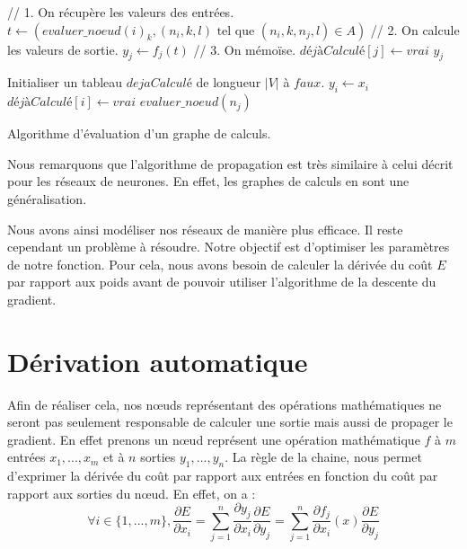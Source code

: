 \begin{algorithm} 
\begin{algorithmic}
		\State // 1. On récupère les valeurs des entrées.
		\State $t \leftarrow (evaluer\_noeud(i)_k, (n_i, k, l)\text{ tel que }(n_i, k, n_j, l) \in A)$
		\State // 2. On calcule les valeurs de sortie.
		\State $y_j \leftarrow f_j(t)$
		\State // 3. On mémoïse.
		\State $déjàCalculé[j] \leftarrow vrai$
	\EndIf
	\State \Return $y_j$
\EndFunction

\State Initialiser un tableau $dejaCalculé$ de longueur $|V|$ à $faux$.
	\State $y_i \leftarrow x_i$
	\State $déjàCalculé[i] \leftarrow vrai$ 
\EndFor
{}
	\State $evaluer\_noeud(n_j)$ 
\EndFor
\EndProcedure
\end{algorithmic}
\caption{Algorithme d'évaluation d'un graphe de calculs.}
\label{propagation_memoisation1}
\end{algorithm}

Nous remarquons que l'algorithme de propagation est très similaire à celui décrit pour les réseaux de neurones. En effet, les graphes de calculs en sont une généralisation.

Nous avons ainsi modéliser nos réseaux de manière plus efficace. Il reste cependant un problème à résoudre. Notre objectif est d'optimiser les paramètres de notre fonction. Pour cela, nous avons besoin de calculer la dérivée du coût $E$ par rapport aux poids avant de pouvoir utiliser l'algorithme de la descente du gradient.

\section{Dérivation automatique}

Afin de réaliser cela, nos n\oe{}uds représentant des opérations mathématiques ne seront pas seulement responsable de calculer une sortie mais aussi de propager le gradient. En effet prenons un n\oe{}ud représent une opération mathématique $f$ à $m$ entrées $x_1, ..., x_m$ et à $n$ sorties $y_1, ..., y_n$. La règle de la chaine, nous permet d'exprimer la dérivée du coût par rapport aux entrées en fonction du coût par rapport aux sorties du n\oe{}ud. En effet, on a :
\begin{equation}
\forall i \in \{1, ...,  m\}, \frac{\partial E}{\partial x_i} = \sum_{j=1}^{n}{\frac{\partial y_j}{\partial x_i}\frac{\partial E}{\partial y_j}} = \sum_{j=1}^{n}{\frac{\partial f_j}{\partial x_i}(x)\frac{\partial E}{\partial y_j}}
\label{retropropagation_graphe}
\end{equation}

